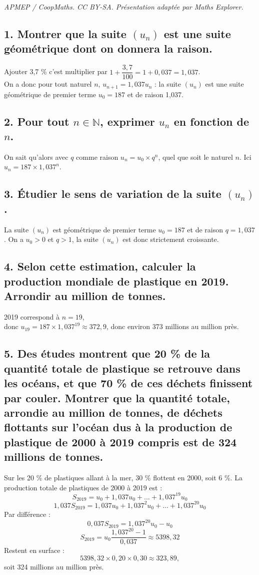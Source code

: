 \documentclass[10pt]{article}
\begin{document}
\noindent\textit{APMEP / CoopMaths. CC BY-SA. Présentation adaptée par Maths Explorer.}\par\medskip
\subsection*{1. Montrer que la suite \((u_n)\) est une suite géométrique dont on donnera la raison.}
Ajouter 3,7 \% c'est multiplier par \(1 + \dfrac{3,7}{100} = 1 + 0,037 = 1,037\).\\
 On a donc pour tout naturel \(n\), \(u_{n+1} = 1,037u_n\) : la suite \((u_n)\) est une suite géométrique de premier terme \(u_0 = 187\) et de raison 1,037.
	
\subsection*{2. Pour tout \(n \in \mathbb{N}\), exprimer \(u_n\) en fonction de \(n\).}
On sait qu'alors avec \(q\) comme raison \(u_n = u_0 \times q^n\), quel que soit le naturel \(n\). Ici \(u_n = 187 \times 1,037^n\).
	
\subsection*{3. Étudier le sens de variation de la suite \((u_n)\).}
	
	
	
	La suite \((u_n)\) est géométrique de premier terme \(u_0=187\) et de raison \(q=1,037\).
	On a \(u_0 > 0\) et \(q>1\), la suite \((u_n)\) est donc strictement croissante.
	
	\subsection*{4. Selon cette estimation, calculer la production mondiale de plastique en 2019. Arrondir au million de tonnes.}
	
	2019 correspond à \(n = 19\), \\
	donc \(u_{19} = 187 \times 1,037^{19} \approx 372,9\), donc environ 373 millions au million près.
	
	\subsection*{5. Des études montrent que 20 \% de la quantité totale de plastique se retrouve dans les océans, et que 70 \% de ces déchets finissent par couler. Montrer que la quantité totale, arrondie au million de tonnes, de déchets flottants sur l'océan dus à la production de plastique de 2000 à 2019 compris est de 324 millions de tonnes.}
	
	Sur les 20 \% de plastiques allant à la mer, 30 \% flottent en 2000, soit 6 \%. La production totale de plastiques de 2000 à 2019 est :
	\[ S_{2019} = u_0 + 1,037u_0 + \ldots + 1,037^{19}u_0 \]
	\[ 1,037S_{2019} = 1,037u_0 + 1,037^2u_0 + \ldots + 1,037^{20}u_0 \]
	Par différence :
	\[ 0,037S_{2019} = 1,037^{20}u_0 - u_0 \]
	\[ S_{2019} = u_0 \dfrac{1,037^{20} - 1}{0,037} \approx 5398,32 \]
	Restent en surface :
	\[ 5398,32 \times 0,20 \times 0,30 \approx 323,89, \]
	soit 324 millions au million près.
\end{document}
